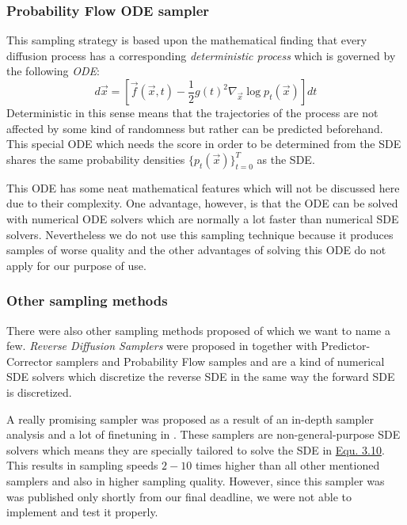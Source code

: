 \subsubsection{Probability Flow ODE sampler}
%
This sampling strategy is based upon the mathematical finding that every diffusion process has a corresponding \textit{deterministic process} which is governed by the following \textit{ODE}:
%
\begin{equation} \label{equ:3.21}
    d\vec{x}=\left[\vec{f}(\vec{x},t)-\frac{1}{2}g(t)^2\nabla_{\vec{x}}\log p_t(\vec{x})\right]dt
\end{equation}
%
Deterministic in this sense means that the trajectories of the process are not affected by some kind of randomness but rather can be predicted beforehand. This special ODE which needs the score in order to be determined from the SDE shares the same probability densities $\{p_t(\vec{x})\}_{t=0}^T$ as the SDE. 

This ODE has some neat mathematical features which will not be discussed here due to their complexity. One advantage, however, is that the ODE can be solved with numerical ODE solvers which are normally a lot faster than numerical SDE solvers. Nevertheless we do not use this sampling technique because it produces samples of worse quality and the other advantages of solving this ODE do not apply for our purpose of use.
%
\subsubsection{Other sampling methods}
%
There were also other sampling methods proposed of which we want to name a few. \textit{Reverse Diffusion Samplers} were proposed in \cite{score_3} together with Predictor-Corrector samplers and Probability Flow samples and are a kind of numerical SDE solvers which discretize the reverse SDE in the same way the forward SDE is discretized.

A really promising sampler was proposed as a result of an in-depth sampler analysis and a lot of finetuning in \cite{gotta_go_fast}. These samplers are non-general-purpose SDE solvers which means they are specially tailored to solve the SDE in \hyperref[equ:3.10]{Equ. 3.10}. This results in sampling speeds $2-10$ times higher than all other mentioned samplers and also in higher sampling quality. However, since this sampler was was published only shortly from our final deadline, we were not able to implement and test it properly.

